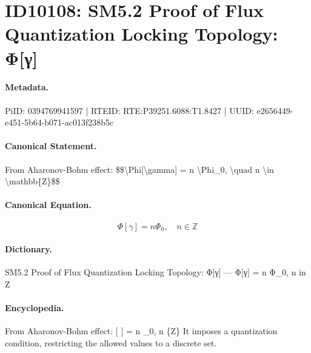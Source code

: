 \section*{ID10108: SM5.2 Proof of Flux Quantization Locking Topology: Φ[γ]}
\paragraph{Metadata.}
PiID: 0394769941597 | RTEID: RTE:P39251.6088:T1.8427 | UUID: e2656449-e451-5b64-b071-ac013f238b5c

\paragraph{Canonical Statement.}
From Aharonov-Bohm effect: \$\$\textbackslash{}Phi[\textbackslash{}gamma] = n \textbackslash{}Phi\_0, \textbackslash{}quad n \textbackslash{}in \textbackslash{}mathbb\{Z\}\$\$

\paragraph{Canonical Equation.}
\[
\Phi[\gamma] = n \Phi_0, \quad n \in \mathbb{Z}
\]

\paragraph{Dictionary.}
SM5.2 Proof of Flux Quantization Locking Topology: Φ[γ] — Φ[γ] = n Φ\_0, n in Z

\paragraph{Encyclopedia.}
From Aharonov-Bohm effect: [ ] = n \_0, n \{Z\} It imposes a quantization condition, restricting the allowed values to a discrete set.
